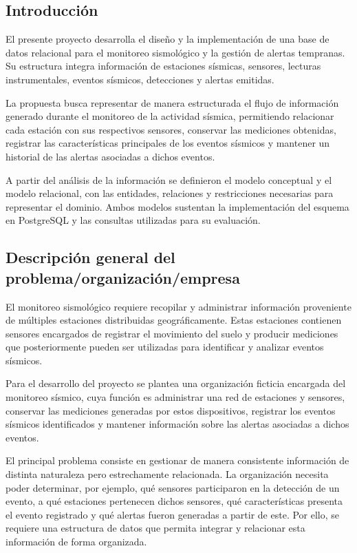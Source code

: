 \documentclass[12pt,a4paper]{article}
\begin{document}
\subsection{Introducción}

El presente proyecto desarrolla el diseño y la implementación de una base de datos relacional para el monitoreo sismológico y la gestión de alertas tempranas. Su estructura integra información de estaciones sísmicas, sensores, lecturas instrumentales, eventos sísmicos, detecciones y alertas emitidas.

La propuesta busca representar de manera estructurada el flujo de información generado durante el monitoreo de la actividad sísmica, permitiendo relacionar cada estación con sus respectivos sensores, conservar las mediciones obtenidas, registrar las características principales de los eventos sísmicos y mantener un historial de las alertas asociadas a dichos eventos.

A partir del análisis de la información se definieron el modelo conceptual y el modelo relacional, con las entidades, relaciones y restricciones necesarias para representar el dominio. Ambos modelos sustentan la implementación del esquema en PostgreSQL y las consultas utilizadas para su evaluación.


\subsection{Descripción general del problema/organización/empresa}

El monitoreo sismológico requiere recopilar y administrar información proveniente de múltiples estaciones distribuidas geográficamente. Estas estaciones contienen sensores encargados de registrar el movimiento del suelo y producir mediciones que posteriormente pueden ser utilizadas para identificar y analizar eventos sísmicos.

Para el desarrollo del proyecto se plantea una organización ficticia encargada del monitoreo sísmico, cuya función es administrar una red de estaciones y sensores, conservar las mediciones generadas por estos dispositivos, registrar los eventos sísmicos identificados y mantener información sobre las alertas asociadas a dichos eventos.

El principal problema consiste en gestionar de manera consistente información de distinta naturaleza pero estrechamente relacionada. La organización necesita poder determinar, por ejemplo, qué sensores participaron en la detección de un evento, a qué estaciones pertenecen dichos sensores, qué características presenta el evento registrado y qué alertas fueron generadas a partir de este. Por ello, se requiere una estructura de datos que permita integrar y relacionar esta información de forma organizada.
\end{document}
